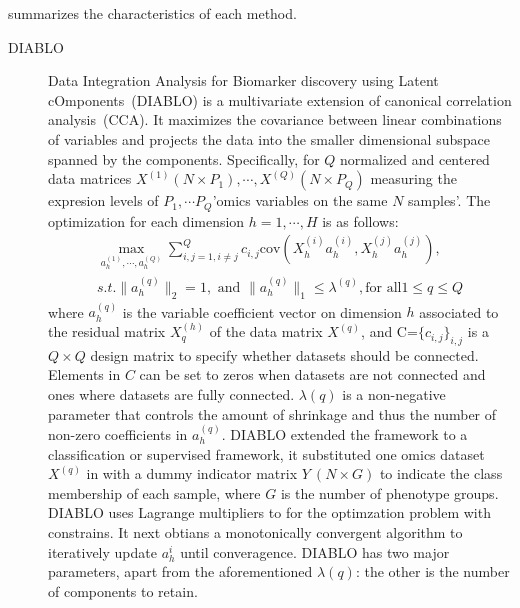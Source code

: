   summarizes the characteristics of each method.

\begin{description}
  \item[DIABLO]
  Data Integration Analysis for Biomarker discovery using Latent cOmponents~(DIABLO) is a multivariate extension of canonical correlation analysis~(CCA). It maximizes the covariance between linear combinations of variables and projects the data into the smaller dimensional subspace spanned by the components. Specifically, for $Q$ normalized and centered data matrices $X^{(1)}(N\times P_1), \cdots, X^{(Q)}(N\times P_Q)$ measuring the expresion levels of $P_1,\cdots P_Q$'omics variables on the same $N$ samples'. The optimization for each dimension $h=1,\cdots, H$ is as follows:
  \begin{equation}
  \begin{aligned}
  	\underset{a_h^{(1)},\cdots,a_h^{(Q)}}{\max} \sum_{i,j=1, i\neq j}^Q c_{i,j} \text{cov}(X_h^{(i)} a_h^{(i)}, X_h^{(j)} a_h^{(j)}),\\
  	s.t. \|a_h^{(q)}\|_2 = 1, \text{ and } \|a_h^{(q)}\|_1 \leq \lambda^{(q)}, \text{for all} 1\leq q \leq Q
  \end{aligned}
  \label{eqn:sGCCA}
  \end{equation}
  where $a_h^{(q)}$ is the variable coefficient vector on dimension $h$ associated to the residual matrix $X_q^{(h)}$ of the data matrix $X^{(q)}$, and C=$\{c_{i,j}\}_{i,j}$ is a $Q\times Q$ design matrix to specify whether datasets should be connected. Elements in $C$ can be set to zeros when datasets are not connected and ones where datasets are fully connected. $\lambda(q)$ is a non-negative parameter that controls the amount of shrinkage and thus the number of non-zero coefficients in $a_h^{(q)}$. DIABLO extended the framework to a classification or supervised framework, it substituted one omics dataset $X^{(q)}$ in  with a dummy indicator matrix $Y\ (N\times G)$ to indicate the class membership of each sample, where $G$ is the number of phenotype groups. DIABLO uses Lagrange multipliers to for the optimzation problem with constrains. It next obtians a monotonically convergent algorithm to iteratively update $a_h^{i}$ until converagence. DIABLO has two major parameters, apart from the aforementioned $\lambda(q)$: the other is the number of components to retain. 



\end{description}
